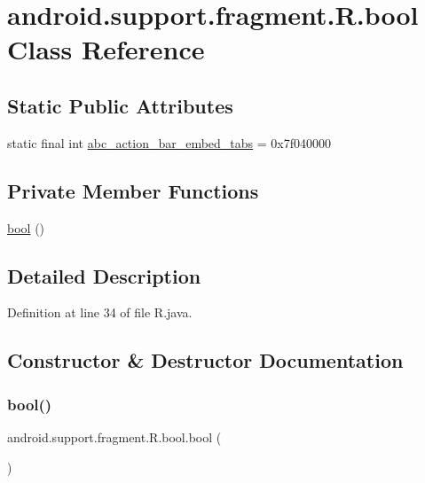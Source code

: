\hypertarget{classandroid_1_1support_1_1fragment_1_1_r_1_1bool}{}\section{android.\+support.\+fragment.\+R.\+bool Class Reference}
\label{classandroid_1_1support_1_1fragment_1_1_r_1_1bool}
\subsection*{Static Public Attributes}
\begin{DoxyCompactItemize}
\item 
static final int \mbox{\hyperlink{classandroid_1_1support_1_1fragment_1_1_r_1_1bool_aade12b7432258093b82bae701731c7f7}{abc\+\_\+action\+\_\+bar\+\_\+embed\+\_\+tabs}} = 0x7f040000
\end{DoxyCompactItemize}
\subsection*{Private Member Functions}
\begin{DoxyCompactItemize}
\item 
\mbox{\hyperlink{classandroid_1_1support_1_1fragment_1_1_r_1_1bool_a72178ce051536edb3896478f9c8621af}{bool}} ()
\end{DoxyCompactItemize}


\subsection{Detailed Description}


Definition at line 34 of file R.\+java.



\subsection{Constructor \& Destructor Documentation}
\mbox{\label{classandroid_1_1support_1_1fragment_1_1_r_1_1bool_a72178ce051536edb3896478f9c8621af}} 
\subsubsection{\texorpdfstring{bool()}{bool()}}
{\footnotesize\ttfamily android.\+support.\+fragment.\+R.\+bool.\+bool (\begin{DoxyParamCaption}{ }\end{DoxyParamCaption})\hspace{0.3cm}{\ttfamily [private]}}



